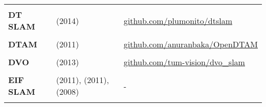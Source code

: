 \documentclass[a4paper,12pt]{scrartcl}
\begin{document}
{\begin{longtable}{l|l|l}
                           &                                                                                             &                                                                                                                              \\ [-3mm]
    \textbf{DT SLAM}       & \cite{Daniel2014} (2014)                                                                    & {\href{https://github.com/plumonito/dtslam}{github.com/plumonito/dtslam}}                                                    \\
                           &                                                                                             &                                                                                                                              \\ [-3mm]
    \textbf{DTAM}          & \cite{Newcombe2011} (2011)                                                                  & {\href{https://github.com/anuranbaka/OpenDTAM}{github.com/anuranbaka/OpenDTAM}}                                              \\
                           &                                                                                             &                                                                                                                              \\ [-3mm]
    \textbf{DVO}           & \cite{Kerl2013} (2013)                                                                      & {\href{https://github.com/tum-vision/dvo_slam}{github.com/tum-vision/dvo\_slam}}                                             \\
                           &                                                                                             &                                                                                                                              \\ [-3mm]
    \textbf{EIF SLAM}      & \cite{He2011} (2011), \cite{AuatCheein2011} (2011), \cite{Zhou2008} (2008)                  & -                                                                                                                            \\
                           &                                                                                             &                                                                                                                              \\ [-3mm]

\end{longtable}}
\end{document}
